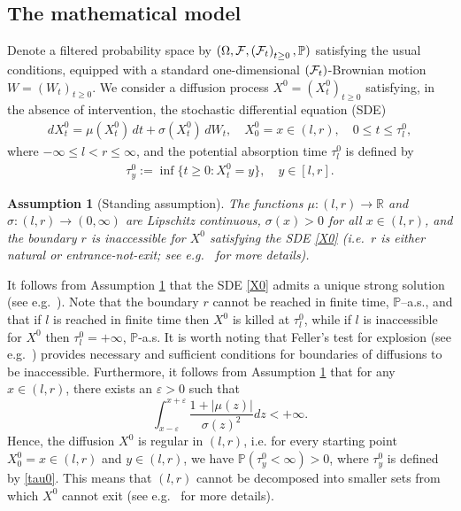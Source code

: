 \documentclass[11pt]{article} %
\newtheorem{assumption}[theorem]{Assumption}
\def\F{\mathcal F}
\numberwithin{komcounter}{section}
\begin{document}
 

\subsection{The mathematical model}\label{sec:sub-model}

Denote a filtered probability space by  $(\Omega, \F, \left({\cal F}_t\right)_{t\geq 0}, \mathbb{P})$ satisfying the usual conditions, equipped with a standard one-dimensional $\left({\cal F}_t\right)$-Brownian motion $W=\left(W_t\right)_{t\geq0}$.
We consider a diffusion process $X^0=\left(X_t^0\right)_{t\geq0}$ satisfying, in the absence of intervention, the stochastic differential equation (SDE) 
\begin{align} \label{X0}
d X_t^0 = \mu(X_t^0) \, dt + \sigma(X_t^0) \, dW_t, \quad  X^0_{0}= x \in (l,r), \quad 0 \leq t \leq \tau^0_l,
\end{align}
where $-\infty \leq l <r\leq \infty$, and the potential absorption time $\tau^0_l$ is defined by 
\begin{align} \label{tau0}
\tau^0_y:= \inf\{t\geq 0: X^0_t = y \}, \quad y \in [l,r].
\end{align}

\begin{assumption}[Standing assumption] \label{Ass:bounds} 
The functions $\mu:(l,r) \rightarrow \mathbb{R}$ and $\sigma:(l,r) \rightarrow (0,\infty)$ are Lipschitz continuous, $\sigma(x)>0$ for all $x\in(l,r)$, and the boundary $r$ is inaccessible for $X^0$ satisfying the SDE \eqref{X0} (i.e.~$r$ is either natural or entrance-not-exit; see e.g.~\cite[Section II.1.6]{borodin2012handbook} for more details).  
\end{assumption}

It follows from Assumption \ref{Ass:bounds} that the SDE \eqref{X0} admits a unique strong solution (see e.g.~\cite[Chapter 5.5]{Karatzas2}).
Note that the boundary $r$ cannot be reached in finite time, $\mathbb{P}$--a.s., and that if $l$ is reached in finite time then $X^0$ is killed at $\tau^0_l$, while if $l$ is inaccessible for $X^0$ then $\tau^0_l=+\infty$, $\mathbb{P}$-a.s.  
It is worth noting that Feller’s test for explosion (see e.g.~\cite[Theorem 5.5.29]{borodin2012handbook})
provides necessary and sufficient conditions for boundaries of diffusions to be inaccessible. Furthermore, it follows from Assumption \ref{Ass:bounds} that for any $x\in(l,r)$, there exists an $\varepsilon > 0$ such that 
$$
\int_{x - \varepsilon}^{x + \varepsilon} \frac{1+ |\mu(z)|}{\sigma(z)^2} dz < + \infty. 
$$
Hence, the diffusion $X^0$ is regular in $(l,r)$, 
i.e. for every starting point $X^0_0 = x \in (l,r)$ and $y \in (l,r)$, we have 
$\mathbb{P}(\tau_y^0 < \infty) > 0$, where $\tau_y^0$ is defined by \eqref{tau0}. This means that $(l,r)$ cannot be decomposed into smaller sets from which $X^0$ cannot exit (see e.g.~\cite[Section II]{borodin2012handbook} for more details).
\end{document}
